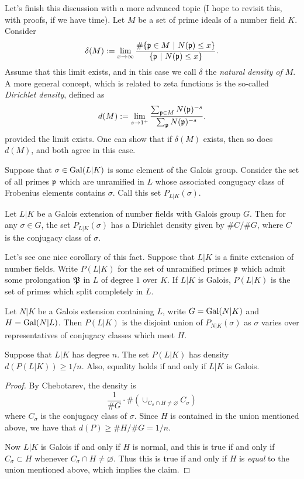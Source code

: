 Let's finish this discussion with a more advanced topic (I hope to revisit this, with proofs, if we have time).
Let $M$ be a set of prime ideals of a number field $K$.
Consider
\[ \delta(M) := \lim_{x \to \infty} \frac{\#\{\mathfrak{p} \in M \ | \ N(\mathfrak{p}) \le x\}}{\{\mathfrak{p} \ | \ N(\mathfrak{p}) \le x\}}. \]
Assume that this limit exists, and in this case we call $\delta$ the \emph{natural density of $M$}.
A more general concept, which is related to zeta functions is the so-called \emph{Dirichlet density}, defined as
\[ d(M) := \lim_{s \to 1^{+}} \frac{\sum_{\mathfrak{p} \in M} N(\mathfrak{p})^{-s}}{\sum_{\mathfrak{p}} N(\mathfrak{p})^{-s}}.  \]
provided the limit exists.
One can show that if $\delta(M)$ exists, then so does $d(M)$, and both agree in this case.

Suppose that $\sigma \in \operatorname{Gal}(L|K)$ is some element of the Galois group.
Consider the set of all primes $\mathfrak{p}$ which are unramified in $L$ whose associated congugacy class of Frobenius elements contains $\sigma$.
Call this set $P_{L|K}(\sigma)$.

\begin{theorem}
  Let $L|K$ be a Galois extension of number fields with Galois group $G$.
  Then for any $\sigma \in G$, the set $P_{L|K}(\sigma)$ has a Dirichlet density given by $\# C / \# G$, where $C$ is the conjugacy class of $\sigma$.
\end{theorem}

Let's see one nice corollary of this fact.
Suppose that $L|K$ is a finite extension of number fields.
Write $P(L|K)$ for the set of unramified primes $\mathfrak{p}$ which admit some prolongation $\mathfrak{P}$ in $L$ of degree $1$ over $K$.
If $L|K$ is Galois, $P(L|K)$ is the set of primes which split completely in $L$.

\begin{lemma}
  Let $N|K$ be a Galois extension containing $L$, write $G = \operatorname{Gal}(N|K)$ and $H = \operatorname{Gal}(N|L)$.
  Then $P(L|K)$ is the disjoint union of $P_{N|K}(\sigma)$ as $\sigma$ varies over representatives of conjugacy classes which meet $H$.
\end{lemma}

\begin{corollary}
  Suppose that $L|K$ has degree $n$.
  The set $P(L|K)$ has density $d(P(L|K)) \geq 1/n$.
  Also, equality holds if and only if $L|K$ is Galois.
\end{corollary}
\begin{proof}
  By Chebotarev, the density is
  \[ \frac{1}{\#G} \cdot \#(\cup_{C_{\sigma} \cap H \neq \varnothing} C_{\sigma})\]
  where $C_{\sigma}$ is the conjugacy class of $\sigma$.
  Since $H$ is contained in the union mentioned above, we have that $d(P) \geq \#H/\#G = 1/n$.

  Now $L|K$ is Galois if and only if $H$ is normal, and this is true if and only if $C_{\sigma} \subset H$ whenever $C_{\sigma} \cap H \neq \varnothing$.
  Thus this is true if and only if $H$ is \emph{equal} to the union mentioned above, which implies the claim.
\end{proof}

